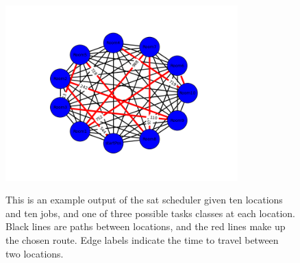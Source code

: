 \documentclass[11pt]{article}
\begin{document}
\begin{figure}
\centering
\includegraphics[width=0.8\textwidth]{Ten_Task_Result.png}
\label{fig:TenTaskResult}
\caption{
  This is an example output
  of the sat scheduler
  given ten locations and ten jobs,
  and one of three possible tasks classes
  at each location.
  Black lines are paths between locations,
  and the red lines
  make up the chosen route.
  Edge labels
  indicate the time to travel
  between two locations.
}
\end{figure}
\end{document}
